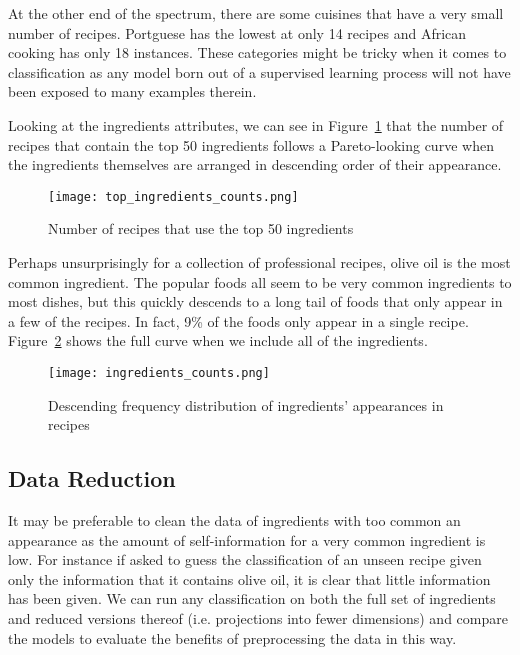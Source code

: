 \documentclass[11pt,a4paper]{article}
\begin{document}
At the other end of the spectrum, there are some cuisines that have a very small
number of recipes. Portguese has the lowest at only 14 recipes and African
cooking has only 18 instances. These categories might be tricky when it comes to
classification as any model born out of a supervised learning process will not
have been exposed to many examples therein.

Looking at the ingredients attributes, we can see in Figure~\ref{top-ingredients}
that the number of recipes that contain the top 50 ingredients follows a
Pareto-looking curve when the ingredients themselves are arranged in descending
order of their appearance.

\begin{figure}[p]
  \texttt{[image: top\_ingredients\_counts.png]}
  \caption{Number of recipes that use the top 50 ingredients\label{top-ingredients}}
\end{figure}

Perhaps unsurprisingly for a collection of professional recipes, olive oil is the most
common ingredient. The popular foods all seem to be very common ingredients to most
dishes, but this quickly descends to a long tail of foods that only appear in a few
of the recipes. In fact, 9\% of the foods only appear in a single recipe.
Figure~\ref{ingredients-counts} shows the full curve when we include all of the
ingredients.

\begin{figure}[p]
  \texttt{[image: ingredients\_counts.png]}
  \caption{Descending frequency distribution of ingredients' appearances in recipes\label{ingredients-counts}}
\end{figure}

\subsection{Data Reduction}
\label{sec:data-reduction}
It may be preferable to clean the data of ingredients
with too common an appearance as the amount of
self-information \cite{reza1961introduction} for a very common ingredient is low. For
instance if asked to guess the classification of an unseen recipe given only
the information that it contains olive oil, it is clear that little information
has been given. We can run any classification on both the full set of ingredients
and reduced versions thereof (i.e. projections into fewer dimensions) and compare
the models to evaluate the benefits of preprocessing the data in this way.
\end{document}
